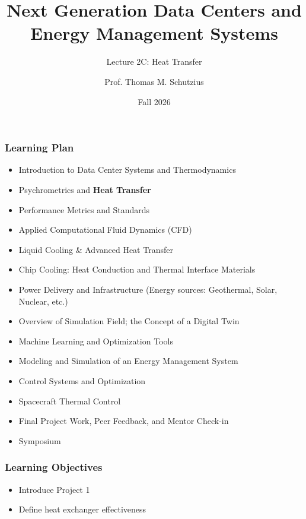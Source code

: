 \documentclass[aspectratio=169,10pt,xcolor={table,dvipsnames},t]{beamer}
\title[lecture 02]{Next Generation Data Centers and Energy Management Systems}
\subtitle{Lecture 2C: Heat Transfer}
\author{Prof. Thomas M. Schutzius}
\institute{Department of Mechanical Engineering}
\date{Fall 2026}
\begin{document}
\begin{frame}
  \titlepage
\end{frame}


{
\smallframetitle
	\begin{frame}
		\frametitle{Learning Plan}
		\begin{itemize}
			\item Introduction to Data Center Systems and Thermodynamics 
			\item Psychrometrics and \textbf{Heat Transfer}
			\item Performance Metrics and Standards
			\item Applied Computational Fluid Dynamics (CFD)
			\item Liquid Cooling \& Advanced Heat Transfer 
			\item Chip Cooling: Heat Conduction and Thermal Interface Materials 
			\item Power Delivery and Infrastructure (Energy sources: Geothermal, Solar, Nuclear, etc.)
			\item Overview of Simulation Field; the Concept of a Digital Twin 
			\item Machine Learning and Optimization Tools 
			\item Modeling and Simulation of an Energy Management System 
			\item Control Systems and Optimization 
			\item Spacecraft Thermal Control
			\item Final Project Work, Peer Feedback, and Mentor Check-in 
			\item Symposium 
		\end{itemize}		
	\end{frame}
}

{
\smallframetitle
	\begin{frame}
		\frametitle{Learning Objectives}
		\begin{itemize}
			\item Introduce Project 1
			\item Define heat exchanger effectiveness
		\end{itemize}		
	\end{frame}
}
\end{document}
